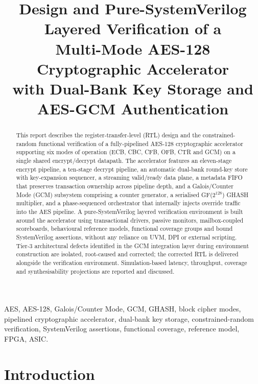 \documentclass[conference,10pt,a4paper]{IEEEtran}
\title{Design and Pure-SystemVerilog Layered Verification of a\\
       Multi-Mode AES-128 Cryptographic Accelerator\\
       with Dual-Bank Key Storage and AES-GCM Authentication}
\author{
\IEEEauthorblockN{Project Author Placeholder}
\IEEEauthorblockA{Department of Electronics and VLSI Engineering\\
Institute Placeholder\\
Email: author@example.org}
}
\begin{document}
\maketitle

\begin{abstract}
This report describes the register-transfer-level (RTL) design and the
constrained-random functional verification of a fully-pipelined AES-128
cryptographic accelerator supporting six modes of operation (ECB, CBC,
CFB, OFB, CTR and GCM) on a single shared encrypt/decrypt datapath.
The accelerator features an eleven-stage encrypt pipeline, a ten-stage
decrypt pipeline, an automatic dual-bank round-key store with key-expansion
sequencer, a streaming valid/ready data plane, a metadata FIFO that
preserves transaction ownership across pipeline depth, and a Galois/Counter
Mode (GCM) subsystem comprising a counter generator, a serialised
GF($2^{128}$) GHASH multiplier, and a phase-sequenced orchestrator that
internally injects override traffic into the AES pipeline.
A pure-SystemVerilog layered verification environment is built around the
accelerator using transactional drivers, passive monitors, mailbox-coupled
scoreboards, behavioural reference models, functional coverage groups and
bound SystemVerilog assertions, without any reliance on UVM, DPI or
external scripting.  Tier-3 architectural defects identified in the GCM
integration layer during environment construction are isolated, root-caused
and corrected; the corrected RTL is delivered alongside the verification
environment.  Simulation-based latency, throughput, coverage and
synthesisability projections are reported and discussed.
\end{abstract}

\begin{IEEEkeywords}
AES, AES-128, Galois/Counter Mode, GCM, GHASH, block cipher modes,
pipelined cryptographic accelerator, dual-bank key storage,
constrained-random verification, SystemVerilog assertions, functional
coverage, reference model, FPGA, ASIC.
\end{IEEEkeywords}

\section{Introduction}
\label{sec:intro}
\end{document}
